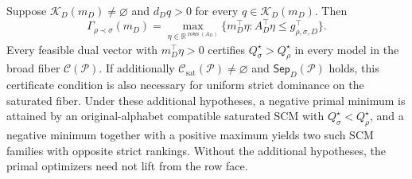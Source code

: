 Suppose \(\mathcal K_D(m_D)\ne\varnothing\) and \(d_Dq>0\) for every \(q\in\mathcal K_D(m_D)\). Then
\[
\Gamma_{\rho\prec\sigma}(m_D)=
\max_{\eta\in\mathbb R^{\operatorname{rows}(A_D)}}
\{m_D^\top\eta:A_D^\top\eta\le g_{\rho,\sigma,D}^\top\}.
\]
Every feasible dual vector with \(m_D^\top\eta>0\) certifies \(Q_\sigma^\star>Q_\rho^\star\) in every model in the broad fiber \(\mathcal C(\mathcal P)\).  If additionally \(\mathcal C_{\mathrm{sat}}(\mathcal P)\ne\varnothing\) and \(\mathsf{Sep}_D(\mathcal P)\) holds, this certificate condition is also necessary for uniform strict dominance on the saturated fiber.  Under these additional hypotheses, a negative primal minimum is attained by an original-alphabet compatible saturated SCM with \(Q_\sigma^\star<Q_\rho^\star\), and a negative minimum together with a positive maximum yields two such SCM families with opposite strict rankings.  Without the additional hypotheses, the primal optimizers need not lift from the row face.